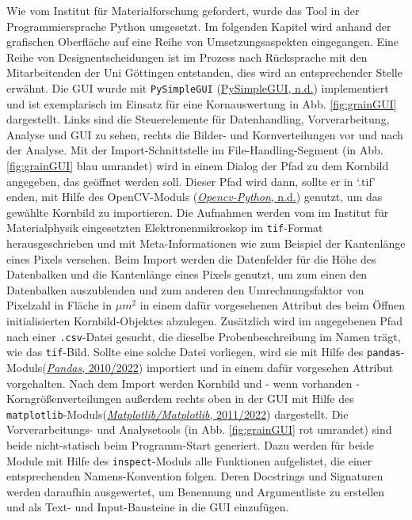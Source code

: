 \documentclass[
  12pt,
  openany]{book}
\begin{document}
Wie vom Institut für Materialforschung gefordert, wurde das Tool in der Programmiersprache Python umgesetzt.
Im folgenden Kapitel wird anhand der grafischen Oberfläche auf eine Reihe von Umsetzungsaspekten eingegangen. Eine Reihe von Designentscheidungen ist im Prozess nach Rücksprache mit den Mitarbeitenden der Uni Göttingen entstanden, dies wird an entsprechender Stelle erwähnt.\newline
Die GUI wurde mit \texttt{PySimpleGUI} (\protect\hyperlink{ref-pysimpleguiPySimpleGUIPythonGUIs}{PySimpleGUI, n.d.}) implementiert und ist exemplarisch im Einsatz für eine Kornauswertung in Abb. \ref{fig:grainGUI} dargestellt. Links sind die Steuerelemente für Datenhandling, Vorverarbeitung, Analyse und GUI zu sehen, rechts die Bilder- und Kornverteilungen vor und nach der Analyse. \newline
Mit der Import-Schnittstelle im File-Handling-Segment (in Abb. \ref{fig:grainGUI} blau umrandet) wird in einem Dialog der Pfad zu dem Kornbild angegeben, das geöffnet werden soll. Dieser Pfad wird dann, sollte er in `.tif' enden, mit Hilfe des OpenCV-Moduls (\protect\hyperlink{ref-OpencvpythonWrapperPackage}{\emph{Opencv-Python}, n.d.}) genutzt, um das gewählte Kornbild zu importieren. Die Aufnahmen werden vom im Institut für Materialphysik eingesetzten Elektronenmikroskop im \texttt{tif}-Format herausgeschrieben und mit Meta-Informationen wie zum Beispiel der Kantenlänge eines Pixels versehen. Beim Import werden die Datenfelder für die Höhe des Datenbalken und die Kantenlänge eines Pixels genutzt, um zum einen den Datenbalken auszublenden und zum anderen den Umrechnungsfaktor von Pixelzahl in Fläche in \(\mu m^2\) in einem dafür vorgesehenen Attribut des beim Öffnen initialisierten Kornbild-Objektes abzulegen. Zusätzlich wird im angegebenen Pfad nach einer \texttt{.csv}-Datei gesucht, die dieselbe Probenbeschreibung im Namen trägt, wie das \texttt{tif}-Bild. Sollte eine solche Datei vorliegen, wird sie mit Hilfe des \texttt{pandas}-Moduls(\protect\hyperlink{ref-PandasPowerfulPython2022}{\emph{Pandas}, 2010/2022}) importiert und in einem dafür vorgesehen Attribut vorgehalten. Nach dem Import werden Kornbild und - wenn vorhanden - Korngrößenverteilungen außerdem rechts oben in der GUI mit Hilfe des \texttt{matplotlib}-Moduls(\protect\hyperlink{ref-MatplotlibMatplotlib2022}{\emph{Matplotlib/Matplotlib}, 2011/2022}) dargestellt.\newline
Die Vorverarbeitungs- und Analysetools (in Abb. \ref{fig:grainGUI} rot umrandet) sind beide nicht-statisch beim Programm-Start generiert. Dazu werden für beide Module mit Hilfe des \texttt{inspect}-Moduls alle Funktionen aufgelistet, die einer entsprechenden Namens-Konvention folgen. Deren Docstrings und Signaturen werden daraufhin ausgewertet, um Benennung und Argumentliste zu erstellen und als Text- und Input-Bausteine in die GUI einzufügen.
\end{document}
